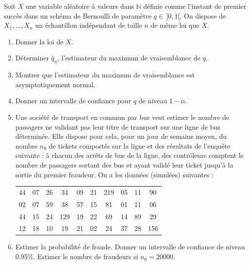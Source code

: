 \begin{mdframed}
\begin{exercice}
Soit $X$ une variable aléatoire à valeurs dans $\mathbb{N}$ définie comme l'instant de premier succès dans un schéma de Bernoulli de paramètre $q \in \, ]0, 1[$. On dispose de $X_1, \dots, X_n$ un échantillon indépendant de taille $n$ de même loi que $X$.

\begin{enumerate}
    \item Donner la loi de $X$.
    \item Déterminer $\hat{q}_n$, l'estimateur du maximum de vraisemblance de $q$.
    \item Montrer que l'estimateur du maximum de vraisemblance est asymptotiquement normal.
    \item Donner un intervalle de confiance pour $q$ de niveau $1 - \alpha$.
    \item Une société de transport en commun par bus veut estimer le nombre de passagers ne validant pas leur titre de transport sur une ligne de bus déterminée. Elle dispose pour cela, pour un jour de semaine moyen, du nombre $n_0$ de tickets compostés sur la ligne et des résultats de l'enquête suivante : à chacun des arrêts de bus de la ligne, des contrôleurs comptent le nombre de passagers sortant des bus et ayant validé leur ticket jusqu'à la sortie du premier fraudeur. On a les données (simulées) suivantes :
    \begin{center}
    \begin{tabular}{cccccccccc}
    44 & 07 & 26 & 34 & 09 & 21 & 219 & 05 & 11 & 90 \\
    02 & 07 & 59 & 38 & 57 & 15 & 81  & 01 & 11 & 06 \\
    44 & 15 & 24 & 129& 19 & 22 & 69  & 14 & 89 & 29 \\
    12 & 18 & 10 & 19 & 21 & 02 & 24  & 37 & 28 & 156
    \end{tabular}
    \end{center}
    \item Estimer la probabilité de fraude. Donner un intervalle de confiance de niveau 0.95\%. Estimer le nombre de fraudeurs si $n_0 = 20000$.
\end{enumerate}
\end{exercice}
\end{mdframed}

\smallskip

